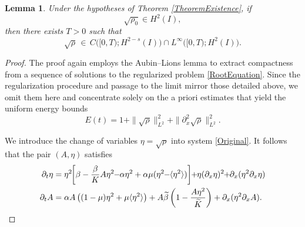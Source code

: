 \documentclass[12pt]{amsart}
\newtheorem{lemma}{Lemma}
\begin{document}
\begin{lemma}\label{RootLemma}
Under the hypotheses of Theorem \ref{TheoremExistence}, if 
\[
\sqrt{\rho_{0}}\in H^{2}(I),
\]
then there exists $T>0$ such that
\[
\sqrt{\rho}\,\in\, C \bigl([0,T);H^{2-s}(I)\bigr) \cap L^\infty \bigl([0,T);H^{2}(I)\bigr).
\]
\end{lemma}
\begin{proof}
	The proof again employs the Aubin--Lions lemma to extract compactness from a sequence of solutions to the regularized problem \eqref{RootEquation}. Since the regularization procedure and passage to the limit mirror those detailed above, we omit them here and concentrate solely on the a priori estimates that yield the uniform energy bounds
	\begin{equation*}
		E(t)=1+ \|\sqrt{\rho}\|_{L^2}^2+\|\partial_{x}^2\sqrt{\rho}\|_{L^2}^2.
	\end{equation*} 

    We introduce the change of variables
$
\eta = \sqrt{\rho}
$
 into system \eqref{Original}. It follows that the pair $(A,\eta)$ satisfies
	\begin{equation}\label{RootEquation}
	\begin{aligned}
		\partial_t \eta&=\eta^2 \hspace{-0,1cm}\left[\beta-\frac{\beta}{K}A\eta^2\hspace{-0,1cm}-\hspace{-0,1cm}\alpha \eta^2+\alpha\mu(\eta^2\hspace{-0,1cm}-\hspace{-0,1cm}\langle \eta^2\rangle)\right]
		\hspace{-0,1cm}+\hspace{-0,1cm}\eta(\partial_x \eta)^2 \hspace{-0,1cm}+ \hspace{-0,1cm}\partial_x(\eta^2\partial_x\eta)\\
		\partial_t A&=\alpha A\left((1-\mu)\eta^2+\mu\langle\eta^2\rangle \right)+A\widetilde{\beta}\left(1-\frac{A\eta^2}{\widetilde{K}}\right)
		+\partial_x(\eta^2\partial_xA).
	\end{aligned}
	\end{equation}
	

\end{proof}
\end{document}
